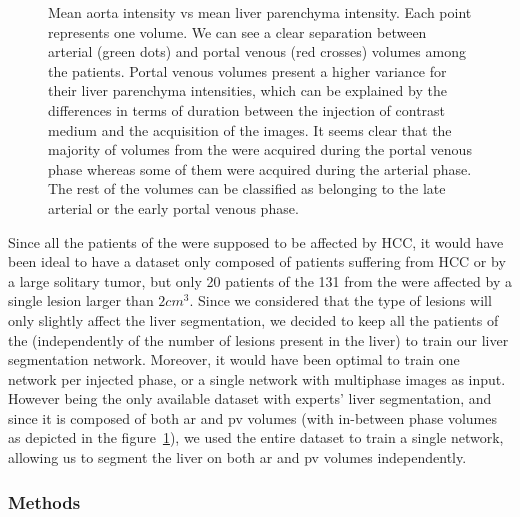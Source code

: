 {\begin{figure}[!ht]
\begin{mdframed}[backgroundcolor=blue!50,linecolor=blue!50]
		\caption{Mean aorta intensity vs mean liver parenchyma intensity. Each point represents one volume. We can see a clear separation between arterial (green dots) and portal venous (red crosses) volumes among the \textbf{} patients. Portal venous volumes present a higher variance for their liver parenchyma intensities, which can be explained by the differences in terms of duration between the injection of contrast medium and the acquisition of the images. It seems clear that the majority of volumes from the \textbf{} were acquired during the portal venous phase whereas some of them were acquired during the arterial phase. The rest of the volumes can be classified as belonging to the late arterial or the early portal venous phase.
		}
		\label{fig:LitsTciaPhasePlot}
	\end{mdframed}
\end{figure}
Since all the patients of the \textbf{} were supposed to be affected by HCC, it would have been ideal to have a dataset only composed of patients suffering from HCC or by a large solitary tumor, but only 20 patients of the 131 from the \textbf{} were affected by a single lesion larger than $ 2cm^3 $.
Since we considered that the type of lesions will only slightly affect the liver segmentation, we decided to keep all the patients of the \textbf{} (independently of the number of lesions present in the liver) to train our liver segmentation network.
Moreover, it would have been optimal to train one network per injected phase, or a single network with multiphase images as input.
However \textbf{} being the only available dataset with experts' liver segmentation, and since it is composed of both \ac{ar} and \ac{pv} volumes (with in-between phase volumes as depicted in the figure \ref{fig:LitsTciaPhasePlot}), we used the entire dataset to train a single network, allowing us to segment the liver on both \ac{ar} and \ac{pv} volumes independently.
}

\subsubsection{Methods}\label{liver_segmentation_tcia_db_methods}


